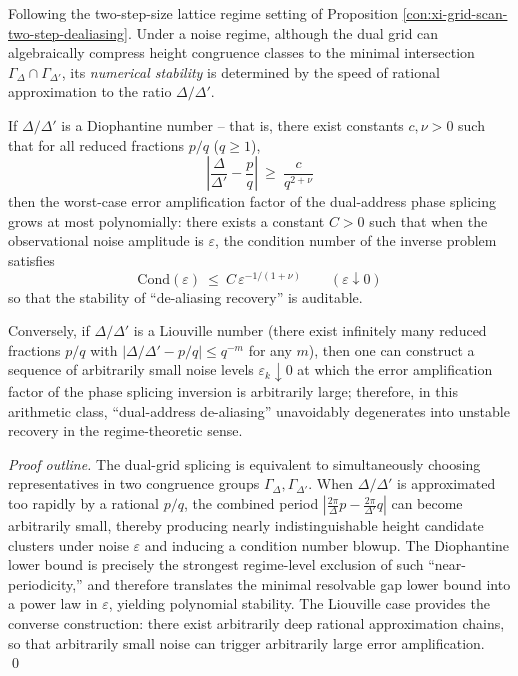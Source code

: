 \begin{proposition}\label{prop:xi-grid-scan-diophantine-dealiasing-stability}
Following the two-step-size lattice regime setting of Proposition \ref{con:xi-grid-scan-two-step-dealiasing}.
Under a noise regime, although the dual grid can algebraically compress height congruence classes to the minimal intersection \(\Gamma_\Delta\cap\Gamma_{\Delta'}\), its \emph{numerical stability} is determined by the speed of rational approximation to the ratio \(\Delta/\Delta'\).
\par
If \(\Delta/\Delta'\) is a Diophantine number -- that is, there exist constants \(c,\nu>0\) such that for all reduced fractions \(p/q\) (\(q\ge 1\)),
\[
\boxed{\;
\left|\frac{\Delta}{\Delta'}-\frac{p}{q}\right|\ \ge\ \frac{c}{q^{2+\nu}}\;}
\]
then the worst-case error amplification factor of the dual-address phase splicing grows at most polynomially: there exists a constant \(C>0\) such that when the observational noise amplitude is \(\varepsilon\), the condition number of the inverse problem satisfies
\[
\boxed{\;
\mathrm{Cond}(\varepsilon)\ \le\ C\,\varepsilon^{-1/(1+\nu)}\qquad(\varepsilon\downarrow 0)\;}
\]
so that the stability of ``de-aliasing recovery'' is auditable.
\par
Conversely, if \(\Delta/\Delta'\) is a Liouville number (there exist infinitely many reduced fractions \(p/q\) with \(|\Delta/\Delta'-p/q|\le q^{-m}\) for any \(m\)), then one can construct a sequence of arbitrarily small noise levels \(\varepsilon_k\downarrow 0\) at which the error amplification factor of the phase splicing inversion is arbitrarily large; therefore, in this arithmetic class, ``dual-address de-aliasing'' unavoidably degenerates into unstable recovery in the regime-theoretic sense.
\end{proposition}
\begin{proof}[Proof outline]
The dual-grid splicing is equivalent to simultaneously choosing representatives in two congruence groups \(\Gamma_\Delta,\Gamma_{\Delta'}\).
When \(\Delta/\Delta'\) is approximated too rapidly by a rational \(p/q\), the combined period
\(
\left|\frac{2\pi}{\Delta}p-\frac{2\pi}{\Delta'}q\right|
\)
can become arbitrarily small, thereby producing nearly indistinguishable height candidate clusters under noise \(\varepsilon\) and inducing a condition number blowup.
The Diophantine lower bound is precisely the strongest regime-level exclusion of such ``near-periodicity,'' and therefore translates the minimal resolvable gap lower bound into a power law in \(\varepsilon\), yielding polynomial stability.
The Liouville case provides the converse construction: there exist arbitrarily deep rational approximation chains, so that arbitrarily small noise can trigger arbitrarily large error amplification. \qed
\end{proof}

\endinput

